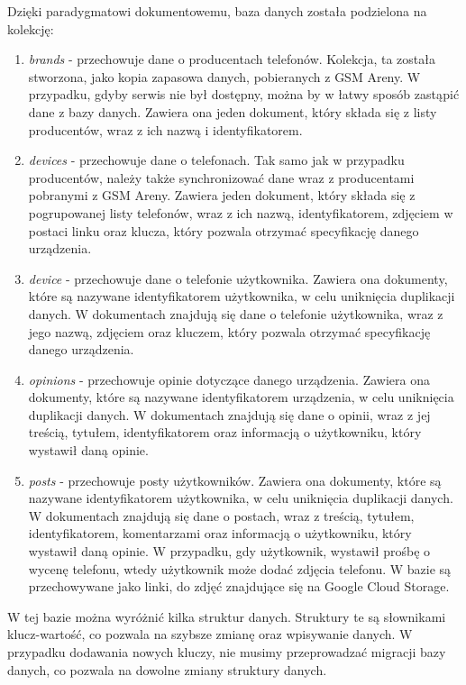 Dzięki paradygmatowi dokumentowemu, baza danych została podzielona na kolekcję:
\begin{enumerate}
    \item \textit{brands} - przechowuje dane o producentach telefonów. Kolekcja, ta została stworzona, jako kopia zapasowa danych, pobieranych z GSM Areny. W przypadku, gdyby serwis nie był dostępny, można by w łatwy sposób zastąpić dane z bazy danych. Zawiera ona jeden dokument, który składa się z listy producentów, wraz z ich nazwą i identyfikatorem.
    \item \textit{devices} - przechowuje dane o telefonach. Tak samo jak w przypadku producentów, należy także synchronizować dane wraz z producentami pobranymi z GSM Areny. Zawiera jeden dokument, który składa się z pogrupowanej listy telefonów, wraz z ich nazwą, identyfikatorem, zdjęciem w postaci linku oraz klucza, który pozwala otrzymać specyfikację danego urządzenia.
    \item \textit{device} - przechowuje dane o telefonie użytkownika. Zawiera ona dokumenty, które są nazywane identyfikatorem użytkownika, w celu uniknięcia duplikacji danych. W dokumentach znajdują się dane o telefonie użytkownika, wraz z jego nazwą, zdjęciem oraz kluczem, który pozwala otrzymać specyfikację danego urządzenia.
    \item \textit{opinions} - przechowuje opinie dotyczące danego urządzenia. Zawiera ona dokumenty, które są nazywane identyfikatorem urządzenia, w celu uniknięcia duplikacji danych. W dokumentach znajdują się dane o opinii, wraz z jej treścią, tytułem, identyfikatorem oraz informacją o użytkowniku, który wystawił daną opinie.
    \item \textit{posts} - przechowuje posty użytkowników. Zawiera ona dokumenty, które są nazywane identyfikatorem użytkownika, w celu uniknięcia duplikacji danych. W dokumentach znajdują się dane o postach, wraz z treścią, tytułem, identyfikatorem, komentarzami oraz informacją o użytkowniku, który wystawił daną opinie. W przypadku, gdy użytkownik, wystawił prośbę o wycenę telefonu, wtedy użytkownik może dodać zdjęcia telefonu. W bazie są przechowywane jako linki, do zdjęć znajdujące się na Google Cloud Storage.
\end{enumerate}

W tej bazie można wyróżnić kilka struktur danych. Struktury te są słownikami klucz-wartość, co pozwala na szybsze zmianę oraz  wpisywanie danych. W przypadku dodawania nowych kluczy, nie musimy przeprowadzać migracji bazy danych, co pozwala na dowolne zmiany struktury danych.

